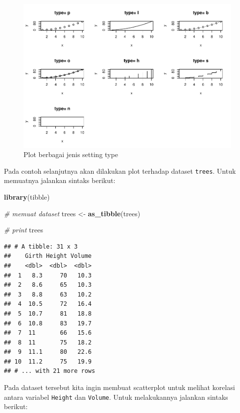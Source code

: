 \documentclass[]{book}
\newenvironment{Shaded}{\begin{snugshade}}{\end{snugshade}}
\newcommand{\KeywordTok}[1]{\textcolor[rgb]{0.13,0.29,0.53}{\textbf{#1}}}
\newcommand{\StringTok}[1]{\textcolor[rgb]{0.31,0.60,0.02}{#1}}
\newcommand{\CommentTok}[1]{\textcolor[rgb]{0.56,0.35,0.01}{\textit{#1}}}
\newcommand{\NormalTok}[1]{#1}
\begin{document}
\begin{figure}

{\centering \includegraphics[width=0.8\linewidth]{EnvStat_files/figure-latex/plot-1} 

}

\caption{Plot berbagai jenis setting type}\label{fig:plot}
\end{figure}

Pada contoh selanjutnya akan dilakukan plot terhadap dataset
\texttt{trees}. Untuk memuatnya jalankan sintaks berikut:

\begin{Shaded}
\begin{Highlighting}[]
\KeywordTok{library}\NormalTok{(tibble)}
\end{Highlighting}
\end{Shaded}

\begin{Shaded}
\begin{Highlighting}[]
\CommentTok{# memuat dataset}
\NormalTok{trees <-}\StringTok{ }\KeywordTok{as_tibble}\NormalTok{(trees)}

\CommentTok{# print }
\NormalTok{trees}
\end{Highlighting}
\end{Shaded}

\begin{verbatim}
## # A tibble: 31 x 3
##    Girth Height Volume
##    <dbl>  <dbl>  <dbl>
##  1   8.3     70   10.3
##  2   8.6     65   10.3
##  3   8.8     63   10.2
##  4  10.5     72   16.4
##  5  10.7     81   18.8
##  6  10.8     83   19.7
##  7  11       66   15.6
##  8  11       75   18.2
##  9  11.1     80   22.6
## 10  11.2     75   19.9
## # ... with 21 more rows
\end{verbatim}

Pada dataset tersebut kita ingin membuat scatterplot untuk melihat
korelasi antara variabel \texttt{Height} dan \texttt{Volume}. Untuk
melakukannya jalankan sintaks berikut:
\end{document}
